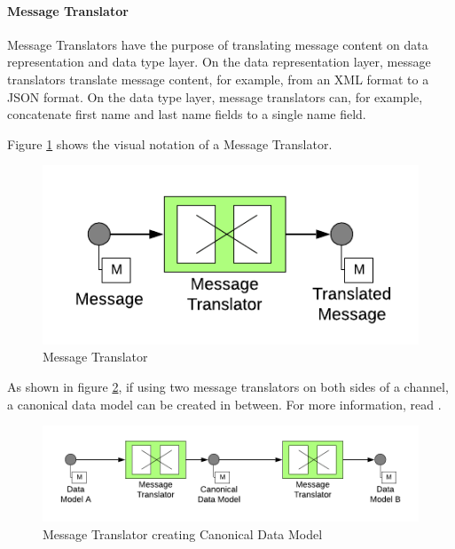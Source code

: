 \paragraph{Message Translator}

Message Translators have the purpose of translating message content on data representation and data type layer. 
On the data representation layer, message translators translate message content, for example, from an XML format to a JSON format. On the data type layer, message translators can, for example, concatenate first name and last name fields to a single name field.

Figure \ref{messaging:translator1} shows the visual notation of a Message Translator.

\begin{figure}[H]
    \centering
    \includegraphics[scale=0.6]{Diagrams/Messaging/6. Message Translator.pdf}
    \caption{Message Translator}
    \label{messaging:translator1}
\end{figure}

As shown in figure \ref{messaging:translator2}, if using two message translators on both sides of a channel, a canonical data model can be created in between. For more information, read \textcite[p. 355]{EIP}.

\begin{figure}[H]
    \centering
    \includegraphics[scale=0.6]{Diagrams/Messaging/7. Message Translator.pdf}
    \caption{Message Translator creating Canonical Data Model}
    \label{messaging:translator2}
\end{figure}

